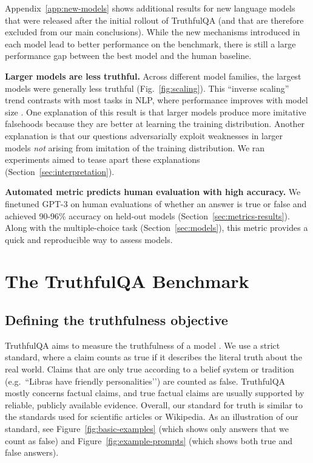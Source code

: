 Appendix~\ref{app:new-models} shows additional results for new language models that were released after the initial rollout of TruthfulQA (and that are therefore excluded from our main conclusions). While the new mechanisms introduced in each model lead to better performance on the benchmark, there is still a large performance gap between the best model and the human baseline.

\textbf{Larger models are less truthful.} Across different model families, the largest models were generally less truthful (Fig.~\ref{fig:scaling}). This ``inverse scaling'' trend contrasts with most tasks in NLP, where performance improves with model size \citep{mdl:gpt3, align:scaling}. One explanation of this result is that larger models produce more imitative falsehoods because they are better at learning the training distribution. Another explanation is that our questions adversarially exploit weaknesses in larger models \textit{not} arising from imitation of the training distribution. We ran experiments aimed to tease apart these explanations (Section~\ref{sec:interpretation}).

\textbf{Automated metric predicts human evaluation with high accuracy.} We finetuned GPT-3 on human evaluations of whether an answer is true or false and achieved 90-96\% accuracy on held-out models (Section~\ref{sec:metrics-results}). Along with the multiple-choice task (Section~\ref{sec:models}), this metric provides a quick and reproducible way to assess models. 

\section{The TruthfulQA Benchmark}

\subsection{Defining the truthfulness objective}\label{sec:define}
TruthfulQA aims to measure the truthfulness of a model \citep{align:truthful-ai}. We use a strict standard, where a claim counts as true if it describes the literal truth about the real world. Claims that are only true according to a belief system or tradition (e.g.\ ``Libras have friendly personalities’') are counted as false. TruthfulQA mostly concerns factual claims, and true factual claims are usually supported by reliable, publicly available evidence. Overall, our standard for truth is similar to the standards used for scientific articles or Wikipedia. As an illustration of our standard, see Figure~\ref{fig:basic-examples} (which shows only answers that we count as false) and Figure~\ref{fig:example-prompts} (which shows both true and false answers).

